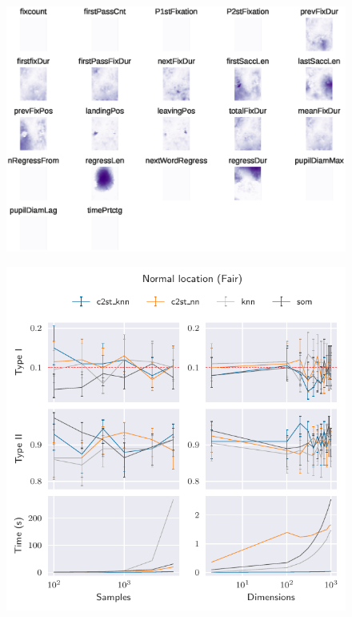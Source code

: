 \documentclass[10pt]{beamer}
\begin{document}
\begin{frame}{}
\begin{figure}
    \centering
    \includegraphics[width=\textwidth]{eye_features.eps}
\end{figure}
\end{frame}

\begin{frame}{}
\begin{figure}
    \centering
    \includegraphics[height=\textheight]{normal_location_fair.pdf}
\end{figure}
\end{frame}
\end{document}
